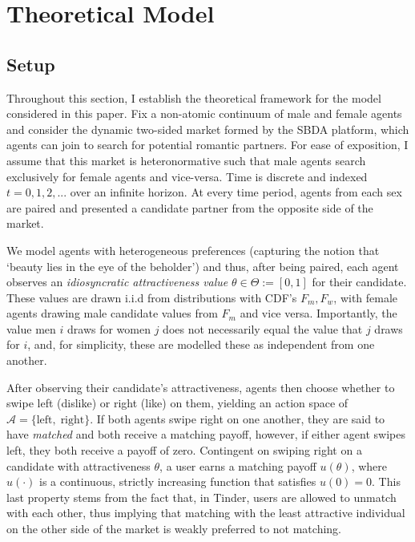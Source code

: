 \section{Theoretical Model}
\label{sec:section2}
\subsection{Setup}\label{sec:section2.1} 
Throughout this section, I establish the theoretical framework for the model considered in this paper. Fix a non-atomic continuum of male and female agents and consider the dynamic two-sided market formed by the SBDA platform, which agents can join to search for potential romantic partners. 
For ease of exposition, I assume that this market is heteronormative such that male agents search exclusively for female agents and vice-versa. 
Time is discrete and indexed $t=0, 1, 2, ...$ over an infinite horizon. 
At every time period, agents from each sex are paired and presented a candidate partner from the opposite side of the market.  
\begin{comment}
    Each agent has an attractiveness type $\theta \in \Theta := [0,1]$ which is unknown to them but observable to their candidate, and it is common knowledge that this is the case.
\end{comment}
We model agents with heterogeneous preferences (capturing the notion that `beauty lies in the eye of the beholder') and thus, after being paired, each agent observes an \textit{idiosyncratic attractiveness value} $\theta \in \Theta := [0,1]$ for their candidate. These values are drawn i.i.d from distributions with CDF's $F_m, F_w$, with female agents drawing male candidate values from $F_m$ and vice versa. Importantly, the value men $i$ draws for women $j$ does not necessarily equal the value that $j$ draws for $i$, and, for simplicity, these are modelled these as independent from one another.

After observing their candidate's attractiveness, agents then choose whether to swipe left (dislike) or right (like) on them, yielding an action space of $\mathcal{A}=\{ \text{left},\; \text{right}\}$. 
If both agents swipe right on one another, they are said to have \textit{matched} and both receive a matching payoff, however, if either agent swipes left, they both receive a payoff of zero. Contingent on swiping right on a candidate with attractiveness $\theta$, a user earns a matching payoff $u(\theta)$, where $u(\cdot)$ is a continuous, strictly increasing function that satisfies $u(0) = 0$. 
This last property stems from the fact that, in Tinder, users are allowed to unmatch with each other, thus implying that matching with the least attractive individual on the other side of the market is weakly preferred to not matching. 

